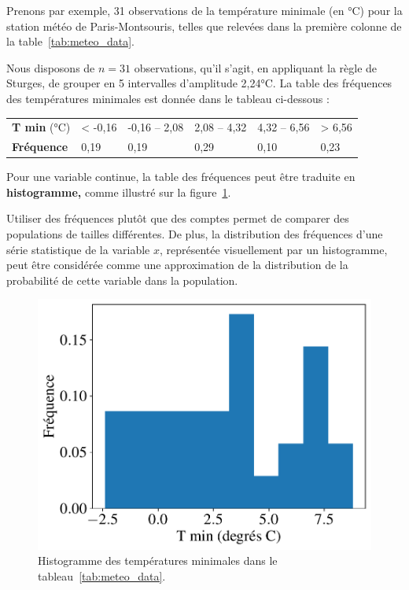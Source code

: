 \begin{exemple}
	Prenons par exemple, 31 observations de la température minimale (en
	\si{\celsius}) pour la station météo de Paris-Montsouris, telles que relevées
	dans la première colonne de la table~\ref{tab:meteo_data}.
	
	Nous disposons de $n=31$ observations, qu'il s'agit, en appliquant la règle de
	Sturges, de grouper en 5 intervalles d'amplitude 2,24\si{\celsius}. La table
	des fréquences des températures minimales est donnée dans le
	tableau ci-dessous : \par %
		\vspace*{-.25em}
		\begin{table}[H]\captionsetup{labelformat=empty} 
			\centering
			\begin{tabular}{lb{1.25cm}b{1.75cm}b{1.75cm}b{1.75cm}b{1.25cm}} \toprule[1.5pt] 
				\textbf{T min} (\si{\celsius}) & < -0,16 & -0,16 -- 2,08 & 2,08 -- 4,32 & 4,32 -- 6,56 & > 6,56 \\ 
				\textbf{Fréquence} & 0,19 & 0,19 & 0,29 & 0,10 & 0,23 \\
				\bottomrule[1.5pt]
			\end{tabular}
		\end{table}
		\vspace*{-1em}
\end{exemple}

Pour une variable continue, la table des fréquences peut être traduite en
\textbf{histogramme,} comme illustré sur la figure~\ref{fig:meteo_tmin_hist}.

Utiliser des fréquences plutôt que des comptes permet de comparer des
populations de tailles différentes. De plus, la distribution des fréquences
d'une série statistique de la variable $x$, représentée visuellement par un
histogramme, peut être considérée comme une approximation de la distribution de
la probabilité de cette variable dans la population.

\begin{figure}[h]
	\centering
	\includegraphics[width=.5\textwidth]{figures/stats/meteo_tmin_hist}
	\caption{Histogramme des températures minimales dans le
		tableau~\ref{tab:meteo_data}.}
	\label{fig:meteo_tmin_hist}
\end{figure}


